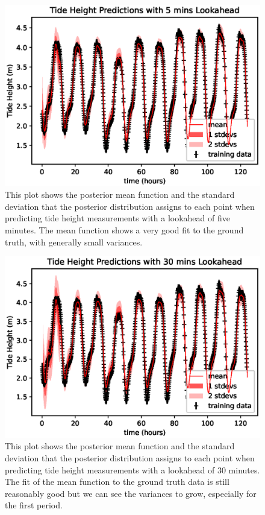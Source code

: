 \documentclass{article}
\begin{document}
                \begin{figure}[ht!]
                    \includegraphics[width=\linewidth,height=\textheight,keepaspectratio]{tide_height_lookahead_5mins.eps}
                    \caption{This plot shows the posterior mean function and the standard deviation that the posterior distribution assigns to each point when predicting tide height measurements with a lookahead of five minutes. The mean function shows a very good fit to the ground truth, with generally small variances.}
                    \label{plot_tideheightlookahead_5mins}
                \end{figure}

                \begin{figure}[ht!]
                    \includegraphics[width=\linewidth,height=\textheight,keepaspectratio]{tide_height_lookahead_30mins.eps}
                    \caption{This plot shows the posterior mean function and the standard deviation that the posterior distribution assigns to each point when predicting tide height measurements with a lookahead of 30 minutes. The fit of the mean function to the ground truth data is still reasonably good but we can see the variances to grow, especially for the first period.}
                    \label{plot_tideheightlookahead_30mins}
                \end{figure}
\end{document}
